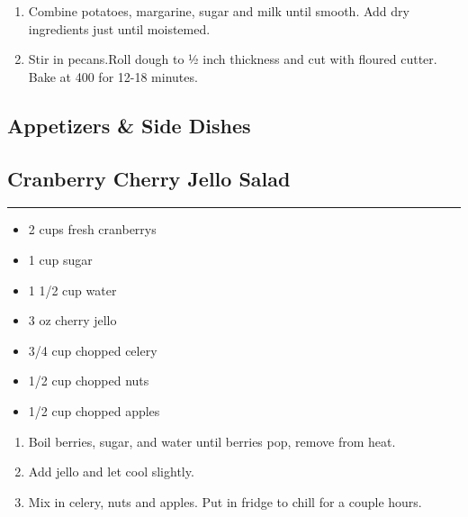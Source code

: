 \documentclass{article}
\begin{document}
\begin{enumerate}
    \item
        Combine potatoes, margarine, sugar and milk until smooth. Add dry ingredients just until moistemed.
    \item
        Stir in pecans.Roll dough to ½ inch thickness and cut with floured cutter. Bake at 400 for 12-18 minutes.
\end{enumerate}
\newpage

\vspace*{\fill}
\begin{center}
    \section{Appetizers \& Side Dishes}
\end{center}
\vspace*{\fill}
\newpage

\subsection{Cranberry Cherry Jello Salad} 
\noindent\rule[0.5ex]{\linewidth}{1pt}

\begin{framed}
    \begin{itemize}
        \item 2 cups fresh cranberrys
        \item 1 cup sugar
        \item 1 1/2 cup water
        \item 3 oz cherry jello 
        \item 3/4 cup chopped celery 
        \item 1/2 cup chopped nuts 
        \item 1/2 cup chopped apples
    \end{itemize}
\end{framed}

\begin{enumerate}
    \item 
        Boil berries, sugar, and water until berries pop, remove from heat.
    \item 
        Add jello and let cool slightly.
    \item 
        Mix in celery, nuts and apples. Put in fridge to chill for a couple hours.
\end{enumerate}
\newpage
\end{document}
